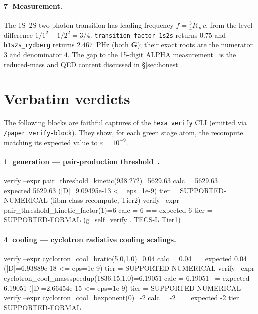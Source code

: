 \documentclass[11pt,a4paper]{article}
\newcommand{\tierGreen}{\textbf{G}}
\newcommand{\stg}[1]{\textcircled{\scriptsize#1}}
\begin{document}
\paragraph{\stg{7} Measurement.} The 1S--2S two-photon transition has
leading frequency $f=\tfrac34 R_\infty c$, from the level difference
$1/1^2-1/2^2=3/4$. \texttt{transition\_factor\_1s2s} returns $0.75$ and
\texttt{h1s2s\_rydberg} returns $2.467$~PHz (both \tierGreen); their exact
roots are the numerator $3$ and denominator $4$. The gap to the 15-digit
ALPHA measurement~\citep{Ahmadi2018} is the reduced-mass and QED content
discussed in \S\ref{sec:honest}.

\section{Verbatim verdicts}
\label{sec:verdicts}

The following blocks are faithful captures of the \texttt{hexa verify}
CLI (emitted via \texttt{/paper verify-block}). They show, for each green
stage atom, the recompute matching its expected value to
$\varepsilon=10^{-9}$.

\paragraph{\stg{1} generation --- pair-production threshold~\citep{Chamberlain1955}.}
\begin{verdict}
verify --expr pair_threshold_kinetic(938.272)=5629.63
  calc   = 5629.63  ~= expected 5629.63  (|D|=9.09495e-13 <= eps=1e-9)
  tier   = SUPPORTED-NUMERICAL  (libm-class recompute, Tier2)
verify --expr pair_threshold_kinetic_factor(1)=6
  calc   = 6  == expected 6
  tier   = SUPPORTED-FORMAL  (g_self_verify . TECS-L Tier1)
\end{verdict}

\paragraph{\stg{4} cooling --- cyclotron radiative cooling scalings.}
\begin{verdict}
verify --expr cyclotron_cool_bratio(5.0,1.0)=0.04
  calc   = 0.04  ~= expected 0.04  (|D|=6.93889e-18 <= eps=1e-9)
  tier   = SUPPORTED-NUMERICAL
verify --expr cyclotron_cool_massspeedup(1836.15,1.0)=6.19051
  calc   = 6.19051  ~= expected 6.19051  (|D|=2.66454e-15 <= eps=1e-9)
  tier   = SUPPORTED-NUMERICAL
verify --expr cyclotron_cool_bexponent(0)=-2
  calc   = -2  == expected -2
  tier   = SUPPORTED-FORMAL
\end{verdict}
\end{document}
